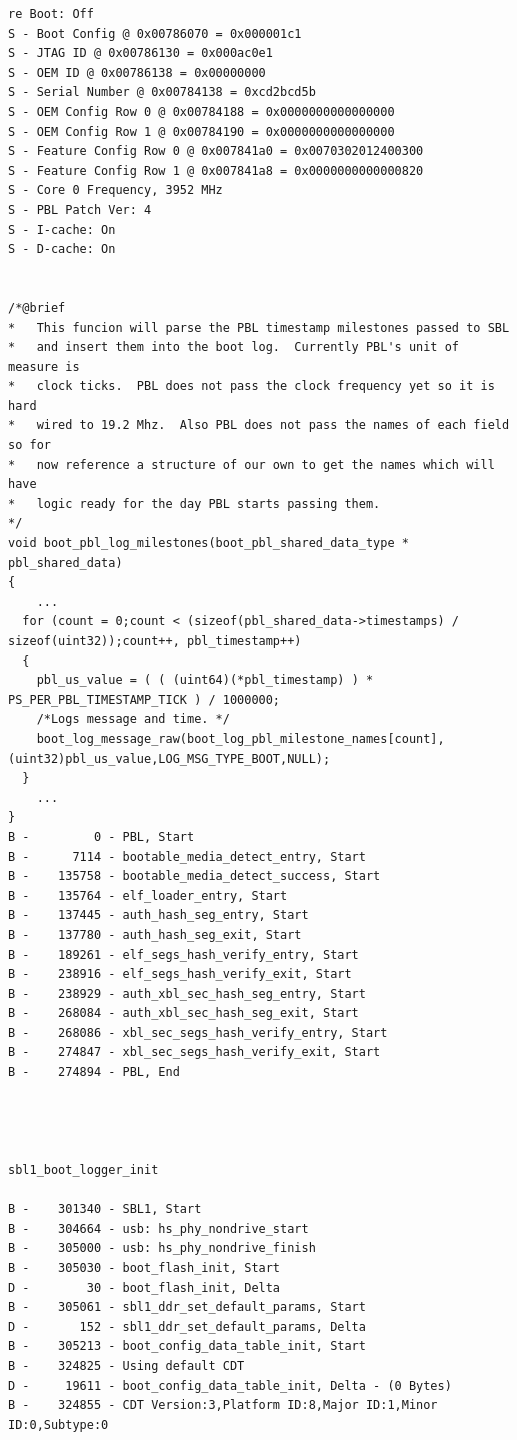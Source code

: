 \begin{lstlisting}
re Boot: Off
S - Boot Config @ 0x00786070 = 0x000001c1
S - JTAG ID @ 0x00786130 = 0x000ac0e1
S - OEM ID @ 0x00786138 = 0x00000000
S - Serial Number @ 0x00784138 = 0xcd2bcd5b
S - OEM Config Row 0 @ 0x00784188 = 0x0000000000000000
S - OEM Config Row 1 @ 0x00784190 = 0x0000000000000000
S - Feature Config Row 0 @ 0x007841a0 = 0x0070302012400300
S - Feature Config Row 1 @ 0x007841a8 = 0x0000000000000820
S - Core 0 Frequency, 3952 MHz
S - PBL Patch Ver: 4
S - I-cache: On
S - D-cache: On


/*@brief
*   This funcion will parse the PBL timestamp milestones passed to SBL
*   and insert them into the boot log.  Currently PBL's unit of measure is
*   clock ticks.  PBL does not pass the clock frequency yet so it is hard
*   wired to 19.2 Mhz.  Also PBL does not pass the names of each field so for
*   now reference a structure of our own to get the names which will have
*   logic ready for the day PBL starts passing them.
*/
void boot_pbl_log_milestones(boot_pbl_shared_data_type * pbl_shared_data)
{
	...
  for (count = 0;count < (sizeof(pbl_shared_data->timestamps) / sizeof(uint32));count++, pbl_timestamp++)
  {
    pbl_us_value = ( ( (uint64)(*pbl_timestamp) ) * PS_PER_PBL_TIMESTAMP_TICK ) / 1000000;
    /*Logs message and time. */
    boot_log_message_raw(boot_log_pbl_milestone_names[count],(uint32)pbl_us_value,LOG_MSG_TYPE_BOOT,NULL);
  }
	...
}
B -         0 - PBL, Start
B -      7114 - bootable_media_detect_entry, Start
B -    135758 - bootable_media_detect_success, Start
B -    135764 - elf_loader_entry, Start
B -    137445 - auth_hash_seg_entry, Start
B -    137780 - auth_hash_seg_exit, Start
B -    189261 - elf_segs_hash_verify_entry, Start
B -    238916 - elf_segs_hash_verify_exit, Start
B -    238929 - auth_xbl_sec_hash_seg_entry, Start
B -    268084 - auth_xbl_sec_hash_seg_exit, Start
B -    268086 - xbl_sec_segs_hash_verify_entry, Start
B -    274847 - xbl_sec_segs_hash_verify_exit, Start
B -    274894 - PBL, End




sbl1_boot_logger_init

B -    301340 - SBL1, Start
B -    304664 - usb: hs_phy_nondrive_start
B -    305000 - usb: hs_phy_nondrive_finish
B -    305030 - boot_flash_init, Start
D -        30 - boot_flash_init, Delta
B -    305061 - sbl1_ddr_set_default_params, Start
D -       152 - sbl1_ddr_set_default_params, Delta
B -    305213 - boot_config_data_table_init, Start
B -    324825 - Using default CDT
D -     19611 - boot_config_data_table_init, Delta - (0 Bytes)
B -    324855 - CDT Version:3,Platform ID:8,Major ID:1,Minor ID:0,Subtype:0


\end{lstlisting}
